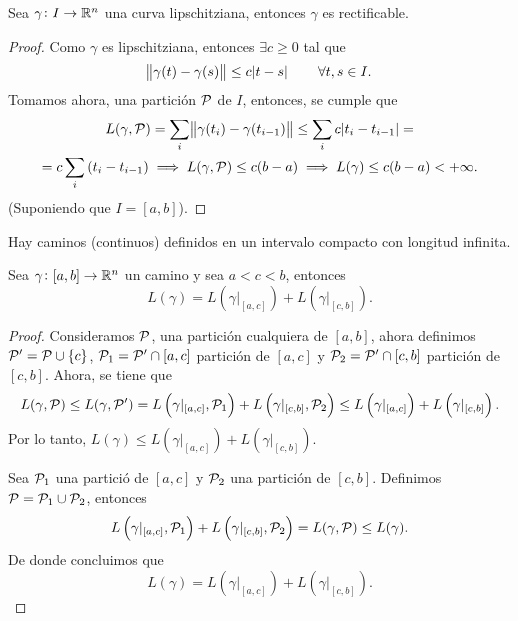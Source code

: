 \begin{prop}
    Sea $\gamma \colon I \to \mathbb{R}^n$ una curva lipschitziana, entonces $\gamma$ es rectificable.
\end{prop}

\begin{proof}
    Como $\gamma$ es lipschitziana, entonces $\exists c \geq 0$ tal que
    \[
        \norm{\gamma(t) - \gamma(s)} \leq c \abs{t - s} \qquad \forall t,s \in I.
    \]
    Tomamos ahora, una partición $\mathcal{P}$ de $I$, entonces, se cumple que
    \begin{gather*}
        L(\gamma, \mathcal{P}) = \sum_i \norm{\gamma(t_i) - \gamma(t_{i-1})} \leq \sum_i c \abs{t_i - t_{i-1}} = \\
        = c \sum_i \left( t_i - t_{i-1} \right) \implies L(\gamma, \mathcal{P}) \leq c (b - a) \implies
        L(\gamma) \leq c(b-a) < +\infty.
    \end{gather*}
    (Suponiendo que $I = [a, b]$).
\end{proof}

\begin{obs*}
    Hay caminos (continuos) definidos en un intervalo compacto con longitud infinita.
\end{obs*}

\begin{prop}
    Sea $\gamma \colon [a, b] \to \mathbb{R}^n$ un camino y sea $a < c < b$, entonces
    \[
        L(\gamma) = L\left( \gamma\vert_{[a,c]} \right) + L\left( \gamma\vert_{[c,b]} \right).
    \]
\end{prop}

\begin{proof}
    Consideramos $\mathcal{P}$, una partición cualquiera de $[a,b]$, ahora definimos $\mathcal{P}^\prime = \mathcal{P} \cup \{c\}$,
    $\mathcal{P}_1 = \mathcal{P}^\prime \cap [a,c]$ partición de $[a,c]$ y $\mathcal{P}_2 = \mathcal{P}^\prime \cap [c, b]$ partición de $[c, b]$.
    Ahora, se tiene que
    \[
        L(\gamma, \mathcal{P}) \leq L(\gamma, \mathcal{P}^\prime) = L\left( \gamma\vert_{[a,c]}, \mathcal{P}_1 \right) +
        L\left( \gamma\vert_{[c,b]}, \mathcal{P}_2 \right) \leq L\left( \gamma\vert_{[a,c]} \right) +
        L\left( \gamma\vert_{[c,b]} \right).
    \]
    Por lo tanto, $L(\gamma) \leq L\left( \gamma\vert_{[a,c]} \right) + L \left( \gamma\vert_{[c,b]} \right)$.

    Sea $\mathcal{P}_1$ una partició de $[a, c]$ y $\mathcal{P}_2$ una partición de $[c, b]$. Definimos $\mathcal{P} = \mathcal{P}_1 \cup \mathcal{P}_2$,
    entonces
    \[
        L\left( \gamma\vert_{[a,c]}, \mathcal{P}_1 \right) + L\left( \gamma\vert_{[c,b]}, \mathcal{P}_2 \right) = L(\gamma, \mathcal{P}) \leq L(\gamma).
    \]
    De donde concluimos que
    \[
        L(\gamma) = L\left( \gamma\vert_{[a,c]} \right) + L\left( \gamma\vert_{[c,b]} \right).
    \]
\end{proof}


